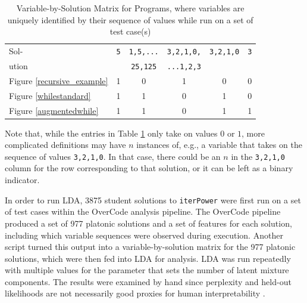 \begin{table}[t]
\caption{Variable-by-Solution Matrix for Programs, where variables are uniquely identified by their sequence of values while run on a set of test case(s)}
\label{varbydocmat}
\begin{center}
\begin{small}
\begin{sc}
\begin{tabular}{| l | c | c | c | c | c |}
\hline
Sol- & \texttt{5} & \texttt{1,5,...} & \texttt{3,2,1,0,} & \texttt{3,2,1,0} & \texttt{3} \\
ution& & \texttt{25,125} & \texttt{...1,2,3} & &  \\
\hline
Figure \ref{recursive_example} & 1 & 0 & 1 & 0 & 0 \\
Figure \ref{whilestandard}     & 1 & 1 & 0 & 1 & 0 \\
Figure \ref{augmentedwhile}    & 1 & 1 & 0 & 1 & 1 \\
\hline
\end{tabular}
\end{sc}
\end{small}
\end{center}
\end{table}

Note that, while the entries in Table \ref{varbydocmat} only take on values $0$ or $1$, more complicated definitions may have $n$ instances of, e.g., a variable that takes on the sequence of values \texttt{3,2,1,0}. In that case, there could be an $n$ in the \texttt{3,2,1,0} column for the row corresponding to that solution, or it can be left as a binary indicator. %


In order to run LDA, 3875 student solutions to \texttt{iterPower} were first run on a set of test cases within the OverCode analysis pipeline. The OverCode pipeline produced a set of 977 platonic solutions and a set of features for each solution, including which variable sequences were observed during execution. Another script turned this output into a variable-by-solution matrix for the 977 platonic solutions, which were then fed into LDA for analysis. LDA was run repeatedly with multiple values for the parameter that sets the number of latent mixture components. The results were examined by hand since perplexity and held-out likelihoods are not necessarily good proxies for human interpretability \cite{readingtealeaves}. 

